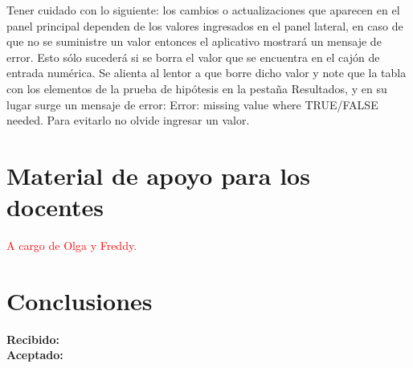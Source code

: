 \documentclass[]{comunicaciones}
\begin{document}
Tener cuidado con lo siguiente: los cambios o actualizaciones que aparecen en el panel principal dependen de los valores ingresados en el panel lateral, en caso de que no se suministre un valor entonces el aplicativo mostrará un mensaje de error. Esto sólo sucederá si se borra el valor que se encuentra en el cajón de entrada numérica. Se alienta al lentor a que borre dicho valor y note que la tabla con los elementos de la prueba de hipótesis en la pestaña Resultados, y en su lugar surge un mensaje de error: Error: missing value where TRUE/FALSE needed. Para evitarlo no olvide ingresar un valor.


\section{Material de apoyo para los docentes}

\textcolor{red}{A cargo de Olga y Freddy.}

\section{Conclusiones}

\begin{flushright}
\textbf{Recibido: }\\
\textbf{Aceptado: }
\end{flushright}

\nocite{*}
\end{document}
